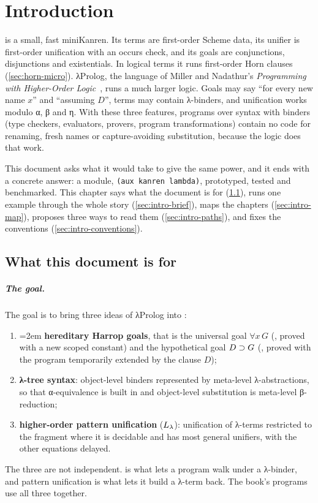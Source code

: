 \chapter{Introduction}\label{ch:intro}

\micro{} is a small, fast miniKanren. Its terms are first-order Scheme data, its unifier is first-order
unification with an occurs check, and its goals are conjunctions, disjunctions and existentials. In
logical terms it runs first-order Horn clauses (\cref{sec:horn-micro}). λProlog, the language of Miller and
Nadathur's \emph{Programming with Higher-Order Logic}~\cite{MillerNadathur2012}, runs a much larger logic.
Goals may say \enquote{for every new name $x$} and \enquote{assuming $D$}, terms may contain λ-binders, and
unification works modulo α, β and η. With these three features, programs over syntax with binders (type
checkers, evaluators, provers, program transformations) contain no code for renaming, fresh names or
capture-avoiding substitution, because the logic does that work.

This document asks what it would take to give \micro{} the same power, and it ends with a concrete answer:
a module, \texttt{(aux kanren lambda)}, prototyped, tested and benchmarked. This chapter says what the
document is for (\cref{sec:intro-goal}), runs one example through the whole story
(\cref{sec:intro-brief}), maps the chapters (\cref{sec:intro-map}), proposes three ways to read them
(\cref{sec:intro-paths}), and fixes the conventions (\cref{sec:intro-conventions}).

\section{What this document is for}\label{sec:intro-goal}

\paragraph{The goal.} The goal is to bring three ideas of λProlog into \micro:
\begin{enumerate}[nosep]
  \item \emergencystretch=2em \textbf{hereditary Harrop goals}, that is the universal goal $\forall x\,G$ (, proved
        with a new scoped constant) and the hypothetical goal $D\supset G$ (, proved with the
        program temporarily extended by the clause $D$);
  \item \textbf{λ-tree syntax}: object-level binders represented by meta-level λ-ab\-strac\-tions, so that
        α-equivalence is built in and object-level substitution is meta-level β-reduction;
  \item \textbf{higher-order pattern unification} ($L_\lambda$): unification of λ-terms restricted to the
        fragment where it is decidable and has most general unifiers, with the other equations delayed.
\end{enumerate}
\noindent The three are not independent.  is what lets a program walk under a λ-binder, and
pattern unification is what lets it build a λ-term back. The book's programs use all three together.

